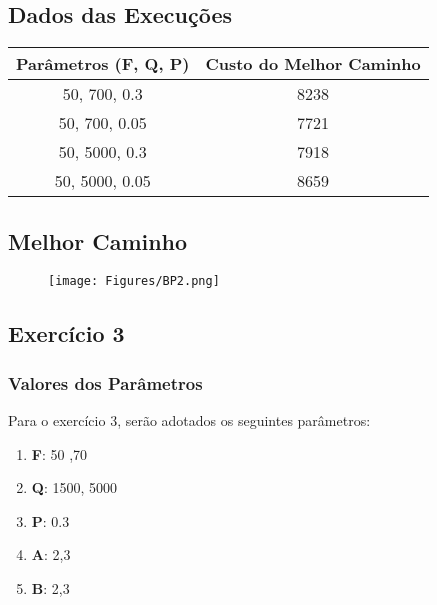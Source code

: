 \documentclass[hidelinks,12pt]{article}
\begin{document}
		\subsection{Dados das Execuções}
		\begin{table}[!h]
		\centering
		
			\begin{tabular}{|c|c|}
			\hline
			\multicolumn{1}{|c|}{Parâmetros (F, Q, P)} & \multicolumn{1}{|c|}{Custo do Melhor Caminho} \\ \hline
			50, 700, 0.3                               &           8238                                   \\ \hline
			50, 700, 0.05                              &           7721                                  \\ \hline
			50, 5000, 0.3                              &           7918                                   \\ \hline
			50, 5000, 0.05                             &           8659                                   \\ \hline

			\end{tabular}
		\end{table}
		
		\subsection{Melhor Caminho}
		
			\begin{figure}[!h]
				\centering
				\texttt{[image: Figures/BP2.png]}
			\end{figure}
	
\subsection{Exercício 3}
		
	\subsubsection{Valores dos Parâmetros}	
	Para o exercício 3, serão adotados os seguintes parâmetros:
	
	\begin{enumerate}
		\item \textbf{F}: 50 ,70
		\item \textbf{Q}: 1500, 5000
		\item \textbf{P}: 0.3
		\item \textbf{A}:  2,3
		\item \textbf{B}:  2,3	
	\end{enumerate}
	
\end{document}
